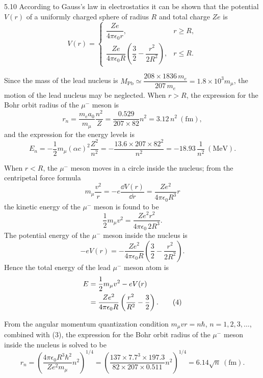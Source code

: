 \begin{solution}{5.10}
According to Gauss's law in electrostatics it can be shown that the potential $V(r)$ of a
uniformly charged sphere of radius $R$ and total charge $Ze$ is
\begin{equation*}
V(r)=
\begin{cases}
\dfrac{Ze}{4\pi\epsilon_0 r}, & r\ge R,\\[3mm]
\dfrac{Ze}{4\pi\epsilon_0 R}\left(\dfrac{3}{2}-\dfrac{r^2}{2R^2}\right), & r\le R.
\end{cases}
\end{equation*}

Since the mass of the lead nucleus is
$M_{\mathrm{Pb}}\simeq\dfrac{208\times 1836\,m_e}{207\,m_e}=1.8\times10^3 m_\mu$, the motion of
the lead nucleus may be neglected. When $r>R$, the expression for the Bohr orbit radius of the
$\mu^-$ meson is
\begin{equation}
r_n=\frac{m_e a_0}{m_\mu}\frac{n^2}{Z}=\frac{0.529}{207\times 82}n^2=3.12\,n^2\ (\mathrm{fm}),
\tag{1}
\end{equation}
and the expression for the energy levels is
\begin{equation}
E_n=-\frac{1}{2}m_\mu(\alpha c)^2\frac{Z^2}{n^2}
=-\frac{13.6\times 207\times 82^2}{n^2}=-18.93\,\frac{1}{n^2}\ (\mathrm{MeV}).
\tag{2}
\end{equation}

When $r<R$, the $\mu^-$ meson moves in a circle inside the nucleus; from the centripetal force
formula
\begin{equation}
m_\mu\frac{v^2}{r}=-e\frac{\dd V(r)}{\dd r}=\frac{Ze^2}{4\pi\epsilon_0 R^3}r
\tag{3}
\end{equation}
the kinetic energy of the $\mu^-$ meson is found to be
\begin{equation*}
\frac{1}{2}m_\mu v^2=\frac{Ze^2r^2}{4\pi\epsilon_0\,2R^3}.
\end{equation*}
The potential energy of the $\mu^-$ meson inside the nucleus is
\begin{equation*}
-eV(r)=-\frac{Ze^2}{4\pi\epsilon_0 R}\left(\frac{3}{2}-\frac{r^2}{2R^2}\right).
\end{equation*}
Hence the total energy of the lead $\mu^-$ meson atom is
\begin{align}
E&=\frac{1}{2}m_\mu v^2-eV(r)\notag\\
&=\frac{Ze^2}{4\pi\epsilon_0 R}\left(\frac{r^2}{R^2}-\frac{3}{2}\right). \tag{4}
\end{align}

From the angular momentum quantization condition $m_\mu v r=n\hbar$, $n=1,2,3,\dots$, combined
with (3), the expression for the Bohr orbit radius of the $\mu^-$ meson inside the nucleus is
solved to be
\begin{equation}
r_n=\left(\frac{4\pi\epsilon_0 R^3\hbar^2}{Ze^2m_\mu}n^2\right)^{1/4}
=\left(\frac{137\times 7.7^3\times 197.3}{82\times 207\times 0.511}n^2\right)^{1/4}
=6.14\sqrt{n}\ (\mathrm{fm}). \tag{5}
\end{equation}


\end{solution}
